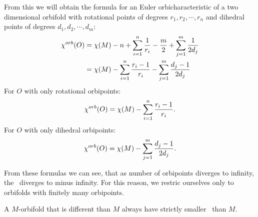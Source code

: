 From this we will obtain the formula for an Euler orbicharacteristic of a two dimensional 
orbifold with rotational points of degrees $r_1, r_2, \cdots, r_n$ and dihedral points 
of degrees $d_1, d_2, \cdots, d_m$:
\begin{align}\label{chi orb expression}
{\chi^{orb}(O)} &= \chi (M) - n + \sum_{i=1}^n \frac{1}{r_i} - \frac{m}{2} + \sum_{j=1}^m \frac{1}{2d_j} \\
&= \chi (M) - \sum_{i=1}^n \frac{r_i-1}{r_i} - \sum_{j=1}^m \frac{d_j-1}{2d_j}
\end{align}
For $O$ with only rotational orbipoints:
\begin{equation}\label{chi orb expression rotational}
{\chi^{orb}(O)} = \chi (M) - \sum_{i=1}^n \frac{r_i-1}{r_i}.
\end{equation}
For $O$ with only dihedral orbipoints:
\begin{equation}\label{chi orb expression dihedral}
{\chi^{orb}(O)} = \chi (M) - \sum_{j=1}^m \frac{d_j-1}{2d_j}.
\end{equation}

From these formulas we can see, that as number of orbipoints diverges to infinity, the \Eoc\ 
diverges to minus infinity. For this reason, we restric ourselves only to orbifolds 
with finitely many orbipoints.
\begin{observation}\label{orbifolds have smaller Eoc than their base manifolds}
A $M$-orbifold that is different than $M$ always have strictly smaller \Eoc\ than $M$. 
\end{observation}


